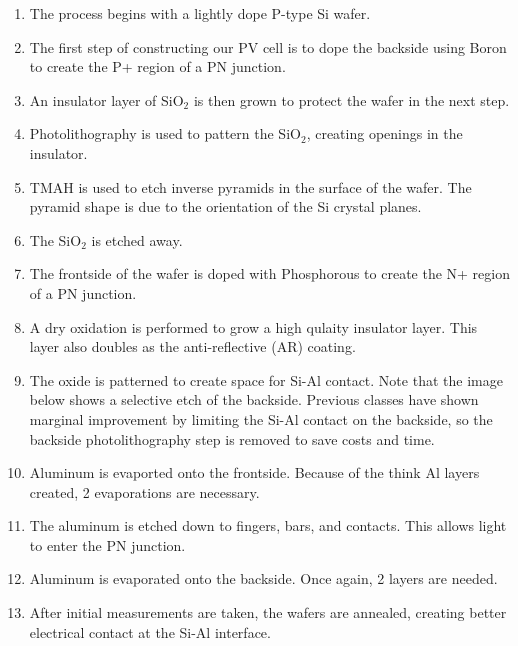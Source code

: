 \documentclass[letter,12pt]{article}
\begin{document}
		\begin{enumerate}
			\item The process begins with a lightly dope P-type Si wafer.
			\item The first step of constructing our PV cell is to dope the backside using Boron to create the P+ region of a PN junction.
			\item An insulator layer of SiO$_2$ is then grown to protect the wafer in the next step.
			\item Photolithography is used to pattern the SiO$_2$, creating openings in the insulator.
			\item TMAH is used to etch inverse pyramids in the surface of the wafer. The pyramid shape is due to the orientation of the Si crystal planes.
			\item The SiO$_2$ is etched away.
			\item The frontside of the wafer is doped with Phosphorous to create the N+ region of a PN junction.
			\item A dry oxidation is performed to grow a high qulaity insulator layer.  This layer also doubles as the anti-reflective (AR) coating.
			\item The oxide is patterned to create space for Si-Al contact. Note that the image below shows a selective etch of the backside. Previous classes have shown marginal improvement by limiting the Si-Al contact on the backside, so the backside photolithography step is removed to save costs and time.
			\item Aluminum is evaported onto the frontside. Because of the think Al layers created, 2 evaporations are necessary.
			\item The aluminum is etched down to fingers, bars, and contacts.  This allows light to enter the PN junction.
			\item Aluminum is evaporated onto the backside. Once again, 2 layers are needed.
			\item After initial measurements are taken, the wafers are annealed, creating better electrical contact at the Si-Al interface. 
		\end{enumerate}
		\FloatBarrier
		
\end{document}
